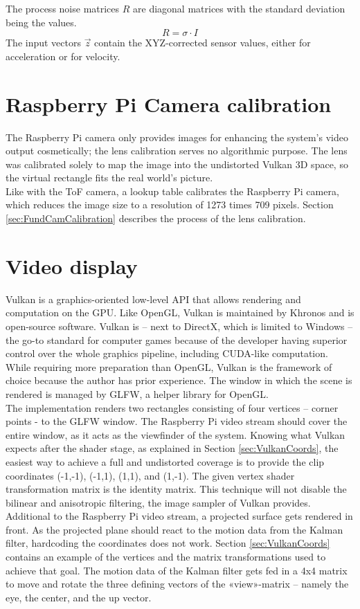 The process noise matrices $R$ are diagonal matrices with the standard deviation being the values.
\begin{equation*}
R = \sigma \cdot I
\end{equation*}
The input vectors $\vec{z}$ contain the XYZ-corrected sensor values, either for acceleration or for velocity.
\section{Raspberry Pi Camera calibration}
\label{sec:RBPiCalibration}
The Raspberry Pi camera only provides images for enhancing the system's video output cosmetically; the lens calibration serves no algorithmic purpose. The lens was calibrated solely to map the image into the undistorted Vulkan 3D space, so the virtual rectangle fits the real world's picture.\\
Like with the ToF camera, a lookup table calibrates the Raspberry Pi camera, which reduces the image size to a resolution of 1273 times 709 pixels. Section \ref{sec:FundCamCalibration} describes the process of the lens calibration.

\section{Video display}
\label{sec:VideoDisplay}
Vulkan is a graphics-oriented low-level API that allows rendering and computation on the GPU. Like OpenGL, Vulkan is maintained by Khronos and is open-source software. Vulkan is – next to DirectX, which is limited to Windows – the go-to standard for computer games because of the developer having superior control over the whole graphics pipeline, including CUDA-like computation. While requiring more preparation than OpenGL, Vulkan is the framework of choice because the author has prior experience. The window in which the scene is rendered is managed by GLFW, a helper library for OpenGL.\\
The implementation renders two rectangles consisting of four vertices – corner points -  to the GLFW window. The Raspberry Pi video stream should cover the entire window, as it acts as the viewfinder of the system. Knowing what Vulkan expects after the shader stage, as explained in Section \ref{sec:VulkanCoords}, the easiest way to achieve a full and undistorted coverage is to provide the clip coordinates (-1,-1), (-1,1), (1,1), and (1,-1). The given vertex shader transformation matrix is the identity matrix. This technique will not disable the bilinear and anisotropic filtering, the image sampler of Vulkan provides.\\
Additional to the Raspberry Pi video stream, a projected surface gets rendered in front. As the projected plane should react to the motion data from the Kalman filter, hardcoding the coordinates does not work. Section \ref{sec:VulkanCoords} contains an example of the vertices and the matrix transformations used to achieve that goal. The motion data of the Kalman filter gets fed in a 4x4 matrix to move and rotate the three defining vectors of the «view»-matrix – namely the eye, the center, and the up vector.
